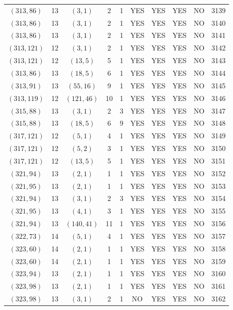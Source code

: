 \begin{longtable}{|c|c|c|c|c|c|c|c|c|c|}
$(313, 86)$ & 13 & $(3, 1)$ & 2 & 1 & YES & YES & YES & NO & 3139\\
$(313, 86)$ & 13 & $(3, 1)$ & 2 & 1 & YES & YES & YES & NO & 3140\\
$(313, 86)$ & 13 & $(3, 1)$ & 2 & 1 & YES & YES & YES & NO & 3141\\
$(313, 121)$ & 12 & $(3, 1)$ & 2 & 1 & YES & YES & YES & NO & 3142\\
$(313, 121)$ & 12 & $(13, 5)$ & 5 & 1 & YES & YES & YES & NO & 3143\\
$(313, 86)$ & 13 & $(18, 5)$ & 6 & 1 & YES & YES & YES & NO & 3144\\
$(313, 91)$ & 13 & $(55, 16)$ & 9 & 1 & YES & YES & YES & NO & 3145\\
$(313, 119)$ & 12 & $(121, 46)$ & 10 & 1 & YES & YES & YES & NO & 3146\\
$(315, 88)$ & 13 & $(3, 1)$ & 2 & 3 & YES & YES & YES & NO & 3147\\
$(315, 88)$ & 13 & $(18, 5)$ & 6 & 9 & YES & YES & YES & NO & 3148\\
$(317, 121)$ & 12 & $(5, 1)$ & 4 & 1 & YES & YES & YES & NO & 3149\\
$(317, 121)$ & 12 & $(5, 2)$ & 3 & 1 & YES & YES & YES & NO & 3150\\
$(317, 121)$ & 12 & $(13, 5)$ & 5 & 1 & YES & YES & YES & NO & 3151\\
$(321, 94)$ & 13 & $(2, 1)$ & 1 & 1 & YES & YES & YES & NO & 3152\\
$(321, 95)$ & 13 & $(2, 1)$ & 1 & 1 & YES & YES & YES & NO & 3153\\
$(321, 94)$ & 13 & $(3, 1)$ & 2 & 3 & YES & YES & YES & NO & 3154\\
$(321, 95)$ & 13 & $(4, 1)$ & 3 & 1 & YES & YES & YES & NO & 3155\\
$(321, 94)$ & 13 & $(140, 41)$ & 11 & 1 & YES & YES & YES & NO & 3156\\
$(322, 73)$ & 14 & $(5, 1)$ & 4 & 1 & YES & YES & YES & NO & 3157\\
$(323, 60)$ & 14 & $(2, 1)$ & 1 & 1 & YES & YES & YES & NO & 3158\\
$(323, 60)$ & 14 & $(2, 1)$ & 1 & 1 & YES & YES & YES & NO & 3159\\
$(323, 94)$ & 13 & $(2, 1)$ & 1 & 1 & YES & YES & YES & NO & 3160\\
$(323, 98)$ & 13 & $(2, 1)$ & 1 & 1 & YES & YES & YES & NO & 3161\\
$(323, 98)$ & 13 & $(3, 1)$ & 2 & 1 & NO & YES & YES & NO & 3162\\

\end{longtable}
